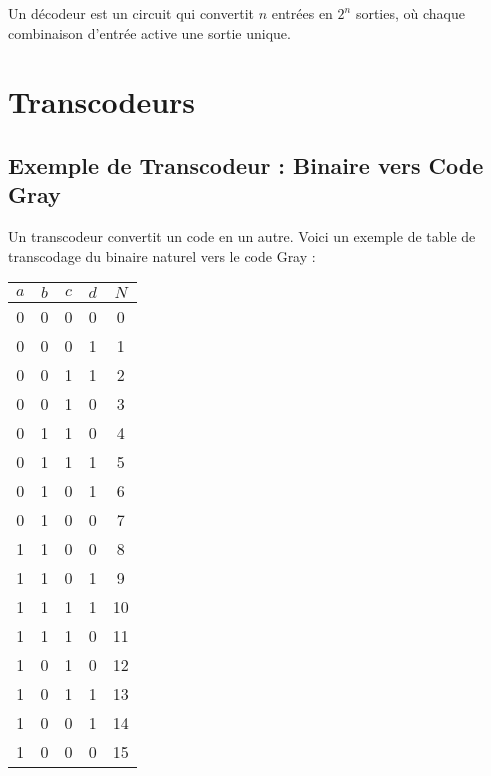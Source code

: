 \documentclass[10pt,a4paper]{article}
\begin{document}
Un décodeur est un circuit qui convertit \( n \) entrées en \( 2^n \) sorties, où chaque combinaison d'entrée active une sortie unique.


\section*{Transcodeurs}

\subsection*{Exemple de Transcodeur : Binaire vers Code Gray}

Un transcodeur convertit un code en un autre. Voici un exemple de table de transcodage du binaire naturel vers le code Gray :

\begin{center}
    \begin{tabular}{|c|c|c|c|c|}
    \hline
    \( a \) & \( b \) & \( c \) & \( d \) & \( N \) \\
    \hline
    0 & 0 & 0 & 0 & 0 \\
    0 & 0 & 0 & 1 & 1 \\
    0 & 0 & 1 & 1 & 2 \\
    0 & 0 & 1 & 0 & 3 \\
    0 & 1 & 1 & 0 & 4 \\
    0 & 1 & 1 & 1 & 5 \\
    0 & 1 & 0 & 1 & 6 \\
    0 & 1 & 0 & 0 & 7 \\
    1 & 1 & 0 & 0 & 8 \\
    1 & 1 & 0 & 1 & 9 \\
    1 & 1 & 1 & 1 & 10 \\
    1 & 1 & 1 & 0 & 11 \\
    1 & 0 & 1 & 0 & 12 \\
    1 & 0 & 1 & 1 & 13 \\
    1 & 0 & 0 & 1 & 14 \\
    1 & 0 & 0 & 0 & 15 \\
    \hline
    \end{tabular}
\end{center}

\end{document}
